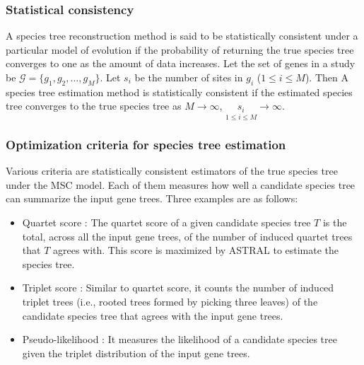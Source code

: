 \subsubsection{Statistical consistency}

A species tree reconstruction method is said to be statistically consistent under a particular model of evolution if the probability of returning the true species tree converges to one as the amount of data increases. Let the set of genes in a study be $\mathcal{G} = \{g_1, g_2, \dots, g_M\}$. Let $s_i$ be the number of sites in $g_i$ ($1 \leq i \leq M$). Then A species tree estimation method is statistically consistent if the estimated species tree converges to the true species tree as $M \rightarrow \infty$, $\underset{1 \leq i \leq M}{s_i} \rightarrow \infty$.


\subsubsection{Optimization criteria for species tree estimation}
Various criteria are statistically consistent estimators of the true species tree under the MSC model. Each of them measures how well a candidate species tree can summarize the input gene trees. Three examples are as follows:
\begin{itemize}
	\item Quartet score \cite{mirarab2014astral}: The quartet score of a given candidate species tree $T$ is the total, across all the input gene trees, of the number of induced quartet trees that $T$ agrees with. This score is maximized by ASTRAL to estimate the species tree.
	\item Triplet score \cite{islam2019stelar}: Similar to quartet score, it counts the number of induced triplet trees (i.e., rooted trees formed by picking three leaves) of the candidate species tree that agrees with the input gene trees.
	\item Pseudo-likelihood \cite{mpest}: It measures the likelihood of a candidate species tree given the triplet distribution of the input gene trees.
\end{itemize}


